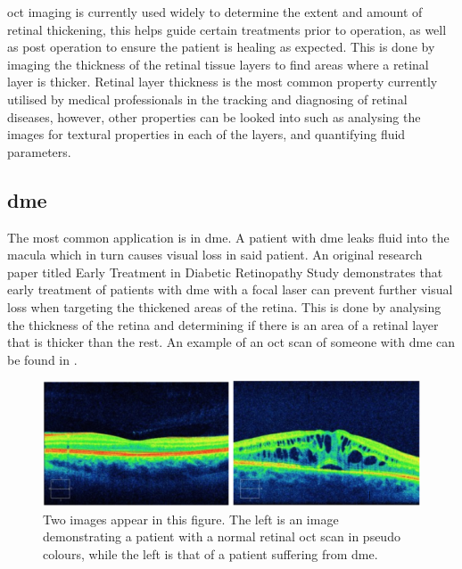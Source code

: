 \Gls{oct} imaging is currently used widely to determine the extent and amount of
retinal thickening, this helps guide certain treatments prior to operation, as well
as post operation to ensure the patient is healing as expected. This is done by
imaging the thickness of the retinal tissue layers to find areas where a retinal
layer is thicker. Retinal layer thickness is the most common property currently
utilised by medical professionals in the tracking and diagnosing of retinal
diseases, however, other properties can be looked into such as analysing
the images for textural properties in each of the layers, and quantifying fluid parameters. \cite{mbib_4}

\subsection{\Gls{dme}}
The most common application is in \Gls{dme}. A patient with \Gls{dme} leaks
fluid into the macula which in turn causes visual loss in said patient.  An
original research paper titled Early Treatment in Diabetic Retinopathy
Study demonstrates that early treatment of patients with \Gls{dme} with a
focal laser can prevent further visual loss when targeting the thickened
areas of the retina. \cite{mbib_4}  This is done by analysing the thickness
of the retina and determining if there is an area of a retinal layer that is thicker
than the rest. An example of an \Gls{oct} scan of someone with \Gls{dme} can
be found in .

\begin{figure}[H]
\centering
\includegraphics{figures/morgan_5}
\caption{Two images appear in this figure. The left is an image demonstrating
a patient with a normal retinal \Gls{oct} scan in pseudo colours, while the left
is that of a patient suffering from \Gls{dme}. \cite{mbib_10} }
\label{fig:m_5}
\end{figure}

